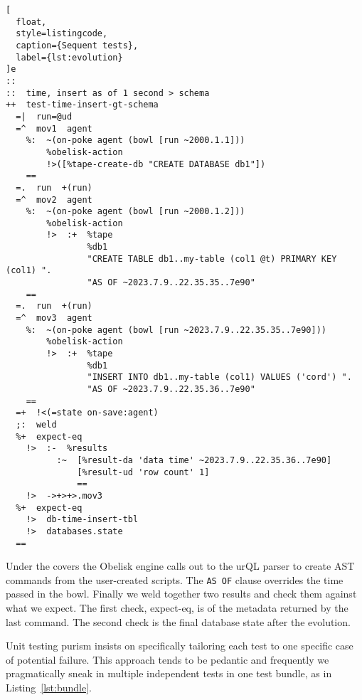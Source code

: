 \documentclass[twoside]{article}
\begin{document}
\begin{lstlisting}[
  float,
  style=listingcode,
  caption={Sequent tests},
  label={lst:evolution}
]e
::
::  time, insert as of 1 second > schema
++  test-time-insert-gt-schema
  =|  run=@ud
  =^  mov1  agent  
    %:  ~(on-poke agent (bowl [run ~2000.1.1]))
        %obelisk-action
        !>([%tape-create-db "CREATE DATABASE db1"])
    ==
  =.  run  +(run)
  =^  mov2  agent  
    %:  ~(on-poke agent (bowl [run ~2000.1.2]))
        %obelisk-action
        !>  :+  %tape
                %db1
                "CREATE TABLE db1..my-table (col1 @t) PRIMARY KEY (col1) ".
                "AS OF ~2023.7.9..22.35.35..7e90"
    ==
  =.  run  +(run)
  =^  mov3  agent  
    %:  ~(on-poke agent (bowl [run ~2023.7.9..22.35.35..7e90]))
        %obelisk-action
        !>  :+  %tape 
                %db1 
                "INSERT INTO db1..my-table (col1) VALUES ('cord') ".
                "AS OF ~2023.7.9..22.35.36..7e90"
    ==
  =+  !<(=state on-save:agent)
  ;:  weld
  %+  expect-eq
    !>  :-  %results
          :~  [%result-da 'data time' ~2023.7.9..22.35.36..7e90]
              [%result-ud 'row count' 1]
              ==
    !>  ->+>+>.mov3
  %+  expect-eq
    !>  db-time-insert-tbl
    !>  databases.state
  ==
\end{lstlisting}

Under the covers the Obelisk engine calls out to the urQL parser to create AST commands from the user-created scripts. The \texttt{AS OF} clause overrides the time passed in the bowl. Finally we weld together two results and check them against what we expect. The first check, expect-eq, is of the metadata returned by the last command. The second check is the final database state after the evolution.

Unit testing purism insists on specifically tailoring each test to one specific case of potential failure. This approach tends to be pedantic and frequently we pragmatically sneak in multiple independent tests in one test bundle, as in Listing~\ref{lst:bundle}.
\end{document}
